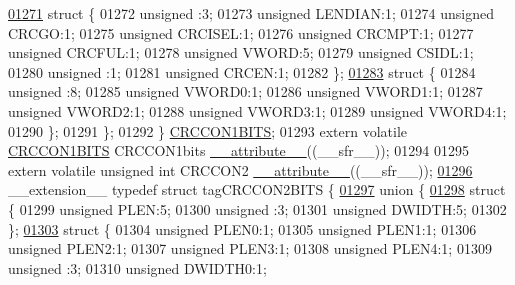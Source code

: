 \begin{DoxyCode}
\hypertarget{a00015_source_l01271}{}\hyperlink{a00015}{01271}     \textcolor{keyword}{struct }\{
01272       \textcolor{keywordtype}{unsigned} :3;
01273       \textcolor{keywordtype}{unsigned} LENDIAN:1;
01274       \textcolor{keywordtype}{unsigned} CRCGO:1;
01275       \textcolor{keywordtype}{unsigned} CRCISEL:1;
01276       \textcolor{keywordtype}{unsigned} CRCMPT:1;
01277       \textcolor{keywordtype}{unsigned} CRCFUL:1;
01278       \textcolor{keywordtype}{unsigned} VWORD:5;
01279       \textcolor{keywordtype}{unsigned} CSIDL:1;
01280       \textcolor{keywordtype}{unsigned} :1;
01281       \textcolor{keywordtype}{unsigned} CRCEN:1;
01282     \};
\hypertarget{a00015_source_l01283}{}\hyperlink{a00015}{01283}     \textcolor{keyword}{struct }\{
01284       \textcolor{keywordtype}{unsigned} :8;
01285       \textcolor{keywordtype}{unsigned} VWORD0:1;
01286       \textcolor{keywordtype}{unsigned} VWORD1:1;
01287       \textcolor{keywordtype}{unsigned} VWORD2:1;
01288       \textcolor{keywordtype}{unsigned} VWORD3:1;
01289       \textcolor{keywordtype}{unsigned} VWORD4:1;
01290     \};
01291   \};
01292 \} \hyperlink{a00014_df/df1/a00357}{CRCCON1BITS};
01293 \textcolor{keyword}{extern} \textcolor{keyword}{volatile} \hyperlink{a00014_df/df1/a00357}{CRCCON1BITS} CRCCON1bits \hyperlink{a00015_a493c46f03454991ccc5aa7a6e1dfb2a7}{\_\_attribute\_\_}((\_\_sfr\_\_));
01294 
01295 \textcolor{keyword}{extern} \textcolor{keyword}{volatile} \textcolor{keywordtype}{unsigned} \textcolor{keywordtype}{int}  CRCCON2 \hyperlink{a00015_a493c46f03454991ccc5aa7a6e1dfb2a7}{\_\_attribute\_\_}((\_\_sfr\_\_));
\hypertarget{a00015_source_l01296}{}\hyperlink{a00014}{01296} \_\_extension\_\_ \textcolor{keyword}{typedef} \textcolor{keyword}{struct }tagCRCCON2BITS \{
\hypertarget{a00015_source_l01297}{}\hyperlink{a00015}{01297}   \textcolor{keyword}{union }\{
\hypertarget{a00015_source_l01298}{}\hyperlink{a00015}{01298}     \textcolor{keyword}{struct }\{
01299       \textcolor{keywordtype}{unsigned} PLEN:5;
01300       \textcolor{keywordtype}{unsigned} :3;
01301       \textcolor{keywordtype}{unsigned} DWIDTH:5;
01302     \};
\hypertarget{a00015_source_l01303}{}\hyperlink{a00015}{01303}     \textcolor{keyword}{struct }\{
01304       \textcolor{keywordtype}{unsigned} PLEN0:1;
01305       \textcolor{keywordtype}{unsigned} PLEN1:1;
01306       \textcolor{keywordtype}{unsigned} PLEN2:1;
01307       \textcolor{keywordtype}{unsigned} PLEN3:1;
01308       \textcolor{keywordtype}{unsigned} PLEN4:1;
01309       \textcolor{keywordtype}{unsigned} :3;
01310       \textcolor{keywordtype}{unsigned} DWIDTH0:1;

\end{DoxyCode}
